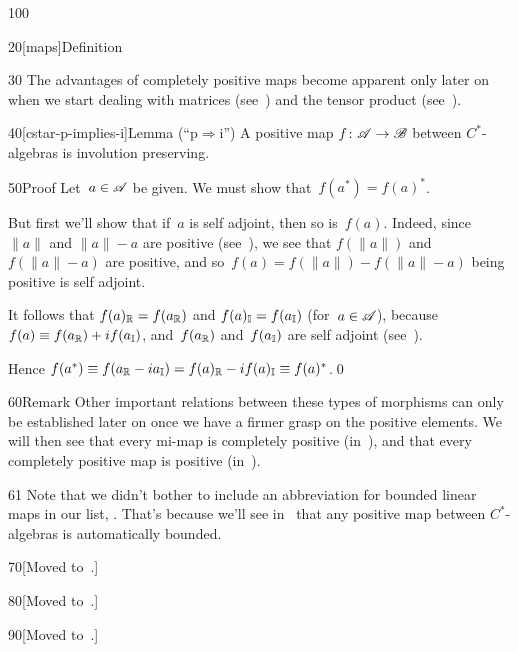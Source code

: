\begin{parsec}{100}
\begin{point}{20}[maps]{Definition}
\begin{point}{30}
The advantages of completely positive maps
become apparent
only later on 
when we start dealing with matrices (see~)
and the tensor product (see~).
\end{point}
\end{point}
\begin{point}{40}[cstar-p-implies-i]{Lemma (``p$\Rightarrow$i'')}
A positive map $f\colon \mathscr{A}\to\mathscr{B}$ between
$C^*$-algebras is involution preserving.
\begin{point}{50}{Proof}%
Let~$a\in \mathscr{A}$ be given. We must show that~$f(a^*)=f(a)^*$.

But first we'll show that if~$a$ is self adjoint,
then so is~$f(a)$.
Indeed, since $\|a\|$ and $\|a\|-a$ are positive (see~),
we see that $f(\|a\|)$ and $f(\|a\|-a)$ are positive,
and so~$f(a)=f(\|a\|)-f(\|a\|-a)$ being positive is self adjoint.

It follows that $f(a)_{\mathbb{R}}=f(a_{\mathbb{R}})$
and $f(a)_{\mathbb{I}}=f(a_{\mathbb{I}})$ (for~$a\in\mathscr{A}$),
because $f(a)\equiv f(a_{\mathbb{R}})+if(a_{\mathbb{I}})$,
and~$f(a_{\mathbb{R}})$ and~$f(a_{\mathbb{I}})$
are self adjoint
(see~).

Hence $f(a^*)\equiv f(a_{\mathbb{R}}-ia_{\mathbb{I}})
=f(a)_{\mathbb{R}}-if(a)_{\mathbb{I}}\equiv f(a)^*$.\qed
\end{point}
\end{point}
\begin{point}{60}{Remark}%
Other important relations between these types of morphisms
can only be established later on
once we have a firmer grasp on the positive elements.
We will then see  
that every mi-map 
is completely positive (in~),
and that every completely positive map is positive 
(in~).
\begin{point}{61}%
Note that we didn't bother to include
an abbreviation for bounded linear maps in our list, .
That's because we'll see in~ that any positive
map between $C^*$-algebras is automatically bounded.
\end{point}
\end{point}
\begin{point}{70}{[Moved to~.]}%
\end{point}
\begin{point}{80}{[Moved to~.]}%
\begin{point}{90}{[Moved to~.]}
\end{point}
\end{point}
\end{parsec}

